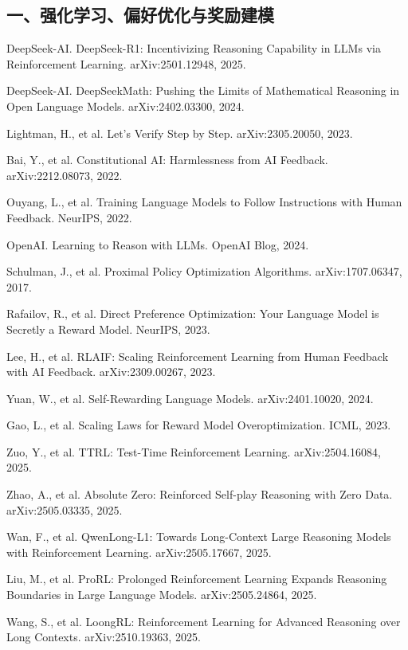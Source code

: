 \documentclass[12pt,a4paper]{article}
\begin{document}
\subsection*{一、强化学习、偏好优化与奖励建模}
\begin{enumerate}[label={[\arabic*]}]
    \item DeepSeek-AI. DeepSeek-R1: Incentivizing Reasoning Capability in LLMs via Reinforcement Learning. arXiv:2501.12948, 2025.

    \item DeepSeek-AI. DeepSeekMath: Pushing the Limits of Mathematical Reasoning in Open Language Models. arXiv:2402.03300, 2024.

    \item Lightman, H., et al. Let's Verify Step by Step. arXiv:2305.20050, 2023.

    \item Bai, Y., et al. Constitutional AI: Harmlessness from AI Feedback. arXiv:2212.08073, 2022.

    \item Ouyang, L., et al. Training Language Models to Follow Instructions with Human Feedback. NeurIPS, 2022.

    \item OpenAI. Learning to Reason with LLMs. OpenAI Blog, 2024.

    \item Schulman, J., et al. Proximal Policy Optimization Algorithms. arXiv:1707.06347, 2017.

    \item Rafailov, R., et al. Direct Preference Optimization: Your Language Model is Secretly a Reward Model. NeurIPS, 2023.

    \item Lee, H., et al. RLAIF: Scaling Reinforcement Learning from Human Feedback with AI Feedback. arXiv:2309.00267, 2023.

    \item Yuan, W., et al. Self-Rewarding Language Models. arXiv:2401.10020, 2024.

    \item Gao, L., et al. Scaling Laws for Reward Model Overoptimization. ICML, 2023.

    \item Zuo, Y., et al. TTRL: Test-Time Reinforcement Learning. arXiv:2504.16084, 2025.

    \item Zhao, A., et al. Absolute Zero: Reinforced Self-play Reasoning with Zero Data. arXiv:2505.03335, 2025.

    \item Wan, F., et al. QwenLong-L1: Towards Long-Context Large Reasoning Models with Reinforcement Learning. arXiv:2505.17667, 2025.

    \item Liu, M., et al. ProRL: Prolonged Reinforcement Learning Expands Reasoning Boundaries in Large Language Models. arXiv:2505.24864, 2025.

    \item Wang, S., et al. LoongRL: Reinforcement Learning for Advanced Reasoning over Long Contexts. arXiv:2510.19363, 2025.
\end{enumerate}
\end{document}
